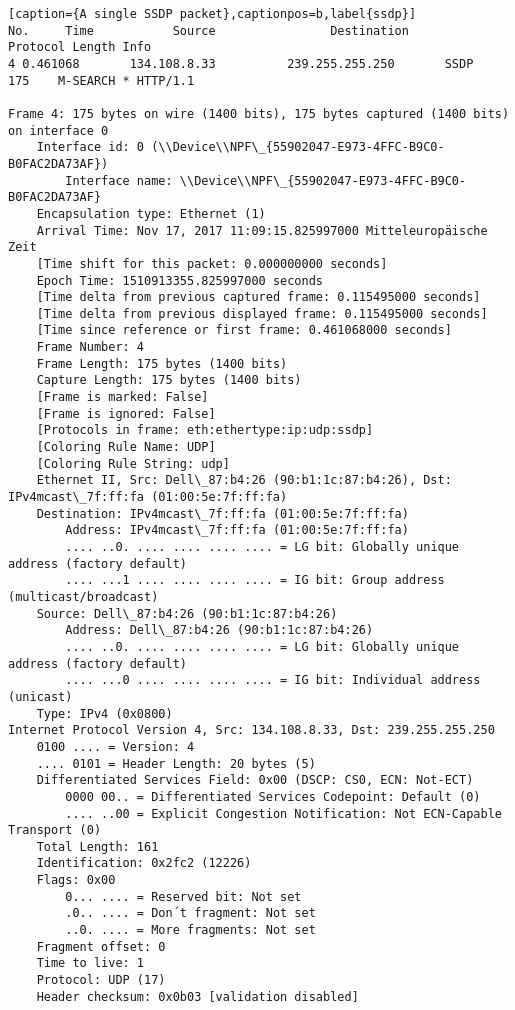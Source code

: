 \begin{lstlisting}[caption={A single SSDP packet},captionpos=b,label{ssdp}]
No.     Time           Source                Destination           Protocol Length Info
4 0.461068       134.108.8.33          239.255.255.250       SSDP     175    M-SEARCH * HTTP/1.1 

Frame 4: 175 bytes on wire (1400 bits), 175 bytes captured (1400 bits) on interface 0
	Interface id: 0 (\\Device\\NPF\_{55902047-E973-4FFC-B9C0-B0FAC2DA73AF})
		Interface name: \\Device\\NPF\_{55902047-E973-4FFC-B9C0-B0FAC2DA73AF}
	Encapsulation type: Ethernet (1)
	Arrival Time: Nov 17, 2017 11:09:15.825997000 Mitteleuropäische Zeit
	[Time shift for this packet: 0.000000000 seconds]
	Epoch Time: 1510913355.825997000 seconds
	[Time delta from previous captured frame: 0.115495000 seconds]
	[Time delta from previous displayed frame: 0.115495000 seconds]
	[Time since reference or first frame: 0.461068000 seconds]
	Frame Number: 4
	Frame Length: 175 bytes (1400 bits)
	Capture Length: 175 bytes (1400 bits)
	[Frame is marked: False]
	[Frame is ignored: False]
	[Protocols in frame: eth:ethertype:ip:udp:ssdp]
	[Coloring Rule Name: UDP]
	[Coloring Rule String: udp]
	Ethernet II, Src: Dell\_87:b4:26 (90:b1:1c:87:b4:26), Dst: IPv4mcast\_7f:ff:fa (01:00:5e:7f:ff:fa)
	Destination: IPv4mcast\_7f:ff:fa (01:00:5e:7f:ff:fa)
		Address: IPv4mcast\_7f:ff:fa (01:00:5e:7f:ff:fa)
		.... ..0. .... .... .... .... = LG bit: Globally unique address (factory default)
		.... ...1 .... .... .... .... = IG bit: Group address (multicast/broadcast)
	Source: Dell\_87:b4:26 (90:b1:1c:87:b4:26)
		Address: Dell\_87:b4:26 (90:b1:1c:87:b4:26)
		.... ..0. .... .... .... .... = LG bit: Globally unique address (factory default)
		.... ...0 .... .... .... .... = IG bit: Individual address (unicast)
	Type: IPv4 (0x0800)
Internet Protocol Version 4, Src: 134.108.8.33, Dst: 239.255.255.250
	0100 .... = Version: 4
	.... 0101 = Header Length: 20 bytes (5)
	Differentiated Services Field: 0x00 (DSCP: CS0, ECN: Not-ECT)
		0000 00.. = Differentiated Services Codepoint: Default (0)
		.... ..00 = Explicit Congestion Notification: Not ECN-Capable Transport (0)
	Total Length: 161
	Identification: 0x2fc2 (12226)
	Flags: 0x00
		0... .... = Reserved bit: Not set
		.0.. .... = Don´t fragment: Not set
		..0. .... = More fragments: Not set
	Fragment offset: 0
	Time to live: 1
	Protocol: UDP (17)
	Header checksum: 0x0b03 [validation disabled]

\end{lstlisting}
